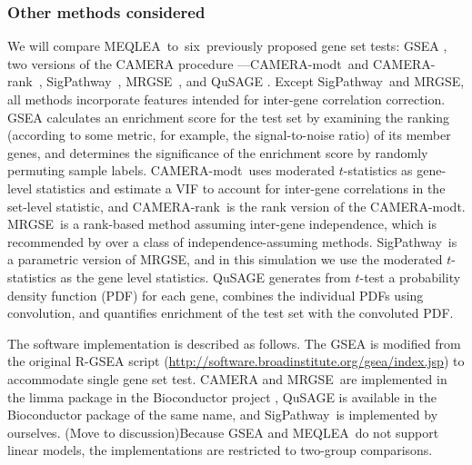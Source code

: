 \documentclass[a4,center,fleqn]{NAR}
\newcommand{\OurMethod}{MEQLEA}
\newcommand{\HowmanyTest}{six}
\newcommand{\CMR}{CAMERA-rank}
\newcommand{\CMT}{CAMERA-modt}
\newcommand{\gent}{SigPathway}
\newcommand{\genr}{MRGSE}
\begin{document}
	
	\subsubsection{Other methods considered}
	
	We will compare \OurMethod~to~\HowmanyTest~previously proposed gene set tests: GSEA
	\citep{subramanian2005gene}, two versions of the CAMERA procedure ---\CMT~and
	\CMR~\citep{wu2012camera}, \gent~\citep{tian2005discovering}, \genr~\citep{michaud2008integrative},
	and QuSAGE \citep{yaari2013quantitative}. Except \gent~and \genr, all methods incorporate 
	features intended for inter-gene correlation correction. GSEA calculates an enrichment score 
	for the test set by examining the ranking (according to some metric, for example, the 
	signal-to-noise ratio) of its member genes, and determines the significance of the enrichment 
	score by randomly permuting sample labels. \CMT~uses moderated $t$-statistics 
	\citep{Smyth2004moderated} as gene-level statistics and estimate a VIF to account for 
	inter-gene correlations in the set-level statistic, and \CMR~is the rank version of the \CMT.
	\genr~is a rank-based method assuming inter-gene independence, which is recommended by 
	\citet{tarca2013comparison} over a class of independence-assuming methods. \gent~is a 
	parametric 
	version of \genr, and in this simulation we use the moderated $t$-statistics as the gene level 
	statistics. 
	QuSAGE generates
	from $t$-test a probability density function (PDF) for each gene, combines the individual PDFs using
	convolution, and quantifies enrichment of the test set with the convoluted PDF. 
	
	
	The software implementation is described as follows. The GSEA is modified from the original 
	R-GSEA script (\url{http://software.broadinstitute.org/gsea/index.jsp}) to accommodate single 
	gene set test.
	CAMERA and \genr~are implemented in the limma package \citep{smyth2005limma} in the Bioconductor
	project \citep{gentleman2004bioconductor}, QuSAGE is available in the Bioconductor package of the
	same name, and \gent~is implemented by ourselves. (Move to discussion)Because GSEA and \OurMethod~do not support linear models, the implementations are restricted to two-group comparisons.
	
\end{document}
